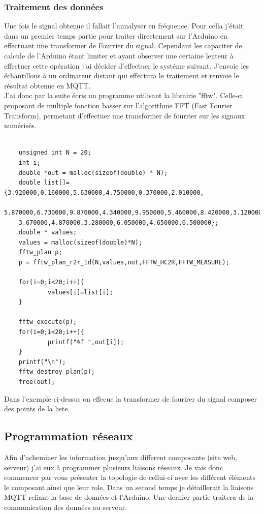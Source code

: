 \documentclass[11pt,french,a4paper]{article}
\begin{document}
\subsubsection{Traitement des données}
Une fois le signal obtenue il fallait l'annalyser en fréquence. Pour cella j'était dans un premier temps partie pour traiter directement sur l'Arduino en effectuant une transformer de Fourrier du signal. Cependant les capaciter de calcule de l'Arduino étant limiter et ayant observer une certaine lenteur à effectuer cette opération j'ai décider d'effectuer le systéme suivant. J'envoie les échantillons à un ordinateur distant qui effectura le traitement et renvoie le résultat obtenue en MQTT.\\
J'ai donc par la suite écris un programme utilisant la librairie "fftw". Celle-ci proposant de multiple fonction basser sur l'algorithme FFT (Fast Fourier Transform), permetant d'effectuer une transformer de fourrier sur les signaux numérisés.

\begin{scriptsize}
\begin{lstlisting}

	unsigned int N = 20;
	int i;
	double *out = malloc(sizeof(double) * N);
	double list[]={3.920000,0.160000,5.630000,4.750000,0.370000,2.010000,
	5.870000,6.730000,9.870000,4.340000,9.950000,5.460000,8.420000,3.120000,
	3.670000,4.870000,3.280000,6.050000,4.650000,0.500000};
	double * values;
	values = malloc(sizeof(double)*N);
	fftw_plan p;
	p = fftw_plan_r2r_1d(N,values,out,FFTW_HC2R,FFTW_MEASURE);
	
	for(i=0;i<20;i++){
			values[i]=list[i];
	}
	
	fftw_execute(p);
	for(i=0;i<20;i++){
			printf("%f ",out[i]);
	}
	printf("\n");
	fftw_destroy_plan(p);
	free(out);
\end{lstlisting}
\end{scriptsize}


Dans l'exemple ci-dessus on effecue la transformer de fourirer du signal composer des points de la liste.
\subsection{Programmation réseaux}
Afin d'acheminer les information jusqu'aux different composante (site web, serveur) j'ai eux à programmer plusieurs liaisons réseaux. Je vais donc commencer par vous présenter la topologie de cellui-ci avec les différent éléments le composant ainsi que leur role. Dans un second temps je détaillerait la liaisons MQTT reliant la base de données et l'Arduino. Une dernier partie traitera de la communication des données au serveur.
\end{document}
